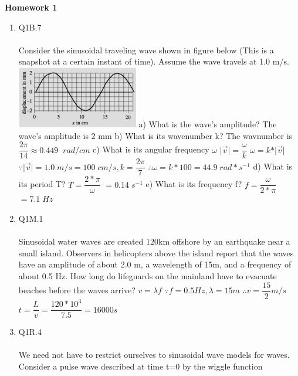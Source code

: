 \documentclass{article}
\theoremstyle{definition}
\theoremstyle{plain}
\begin{document}
\begin{center} \bf \LARGE Homework 1\\
\end{center}


\begin {enumerate}[itemindent=30pt,label=\bf Exercise {\arabic*}:]

\item Q1B.7
\\
\\ Consider the sinusoidal traveling wave shown in figure below (This is a snapshot at a certain instant of time). Assume the wave travels at 1.0 m/s.
\\
\includegraphics{q1b7}
\subitem a) What is the wave's amplitude?
\subitem \;\;\;\;The wave's amplitude is 2 mm
\subitem b) What is its wavenumber k? 
\subitem \;\;\;\;The wavnumber is $\dfrac{2\pi}{14} \approx 0.449\;\;rad/cm$
\subitem c) What is its angular frequency $\omega$
\subitem \;\;\;\;$\vert\overrightarrow{v}\vert = \dfrac{\omega}{k}$
\subitem \;\;\;\;$\omega = k\ast\vert\overrightarrow{v}\vert$
\subitem \;\;\;\;$\because \vert\overrightarrow{v}\vert = 1.0\;m/s = 100\;cm/s, k = \dfrac{2\pi}{7}$ 
\subitem \;\;\;\;$\therefore \omega = k*100 = 44.9 \;rad*s^{-1} $
\subitem d) What is its period T?
\subitem \;\;\;\;$T = \dfrac{2*\pi}{\omega}$
\subitem \;\;\;\;\;\;\;\;$= 0.14\;s^{-1}$
\subitem e) What is its frequency f? 
\subitem \;\;\;\;$f = \dfrac{\omega}{2*\pi}$
\subitem \;\;\;\;\;\;\;\;$=7.1\;Hz$
\\
\item Q1M.1
\\
\\Sinusoidal water waves are created 120km offshore by an earthquake near a small island. Observers in helicopters above the island report that the waves have an amplitude of about 2.0 m, a wavelength of 15m, and a frequency of about 0.5 Hz. How long do lifeguards on the mainland have to evacuate beaches before the waves arrive? 
\subitem $v = \lambda f$
\subitem $\because f = 0.5 Hz, \lambda = 15m$
\subitem $\therefore v = \dfrac{15}{2} m/s$
\subitem $t = \dfrac{L}{v}=\dfrac{120*10^{3}}{7.5} = 16000 s$
\\
\item Q1R.4
\\
\\ We need not have to restrict ourselves to sinusoidal wave models for waves. Consider a pulse wave described at time t=0 by the wiggle function




\end{enumerate}
\end{document}
